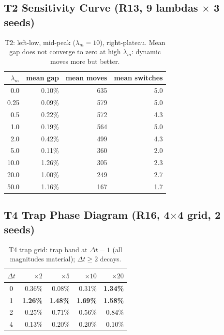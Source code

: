 \documentclass[11pt,a4paper]{article}
\begin{document}
\subsection{T2 Sensitivity Curve (R13, 9 lambdas $\times$ 3 seeds)}

\begin{table}[H]
\centering
\small
\begin{tabular}{rrrr}
\toprule
$\lambda_m$ & mean gap & mean moves & mean switches \\
\midrule
0.0  & 0.10\% & 635 & 5.0 \\
0.25 & 0.09\% & 579 & 5.0 \\
0.5  & 0.22\% & 572 & 4.3 \\
1.0  & 0.19\% & 564 & 5.0 \\
2.0  & 0.42\% & 499 & 4.3 \\
5.0  & 0.11\% & 360 & 2.0 \\
10.0 & 1.26\% & 305 & 2.3 \\
20.0 & 1.00\% & 249 & 2.7 \\
50.0 & 1.16\% & 167 & 1.7 \\
\bottomrule
\end{tabular}
\caption{T2: left-low, mid-peak ($\lambda_m=10$), right-plateau.
Mean gap does not converge to zero at high $\lambda_m$: dynamic moves
more but better. \label{tab:r13}}
\end{table}

\subsection{T4 Trap Phase Diagram (R16, 4$\times$4 grid, 2 seeds)}

\begin{table}[H]
\centering
\small
\begin{tabular}{c rrrr}
\toprule
$\Delta t$ & $\times 2$ & $\times 5$ & $\times 10$ & $\times 20$ \\
\midrule
0 & 0.36\% & 0.08\% & 0.31\% & \textbf{1.34\%} \\
1 & \textbf{1.26\%} & \textbf{1.48\%} & \textbf{1.69\%} & \textbf{1.58\%} \\
2 & 0.25\% & 0.71\% & 0.56\% & 0.84\% \\
4 & 0.13\% & 0.20\% & 0.20\% & 0.10\% \\
\bottomrule
\end{tabular}
\caption{T4 trap grid: trap band at $\Delta t=1$ (all magnitudes material);
$\Delta t \geq 2$ decays. \label{tab:r16}}
\end{table}
\end{document}
